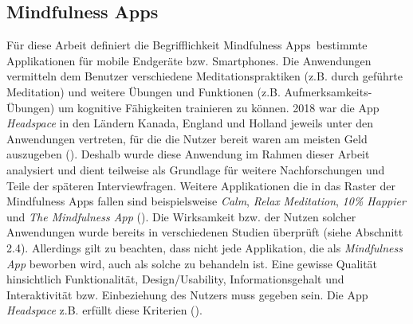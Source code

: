 \documentclass[10pt]{article}
\newcommand{\zit}[1]{(\cite{#1})}
\begin{document}
\subsection{Mindfulness Apps}
Für diese Arbeit definiert die Begrifflichkeit  \grqq Mindfulness Apps\grqq\ bestimmte Applikationen für mobile Endgeräte bzw. Smartphones. Die Anwendungen vermitteln dem Benutzer verschiedene Meditationspraktiken (z.B. durch geführte Meditation) und weitere Übungen und Funktionen (z.B. Aufmerksamkeits-Übungen) um kognitive Fähigkeiten trainieren zu können. 2018 war die App \textit{Headspace} in den Ländern Kanada, England und Holland jeweils unter den Anwendungen vertreten, für die die Nutzer bereit waren am meisten Geld auszugeben \zit{SteigendeNutzung}. Deshalb wurde diese Anwendung im Rahmen dieser Arbeit analysiert und dient teilweise als Grundlage für weitere Nachforschungen und Teile der späteren Interviewfragen. 
Weitere Applikationen die in das Raster der Mindfulness Apps fallen sind beispielsweise \textit{Calm}, \textit{Relax} \textit{Meditation}, \textit{10\% Happier} und\textit{ The Mindfulness App }\zit{VergleichApps}. Die Wirksamkeit bzw. der Nutzen solcher Anwendungen wurde bereits in verschiedenen Studien überprüft (siehe Abschnitt 2.4). Allerdings gilt zu beachten, dass nicht jede Applikation, die als \textit{Mindfulness App} beworben wird, auch als solche zu behandeln ist. Eine gewisse Qualität hinsichtlich Funktionalität, Design/Usability, Informationsgehalt und Interaktivität bzw. Einbeziehung des Nutzers muss gegeben sein. Die App \textit{Headspace} z.B. erfüllt diese Kriterien \zit{KriterienApp}. 
\end{document}
